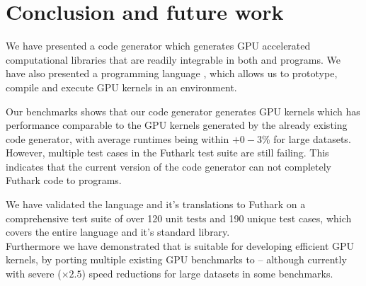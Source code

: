 \chapter{Conclusion and future work}
We have presented a code generator which generates GPU accelerated computational
libraries that are readily integrable in both \csharp{} and \fsharp{} programs.
We have also presented a programming language \fshark{}, which allows us to
prototype, compile and execute GPU kernels in an \fsharp{} environment.

Our benchmarks shows that our \csharp{} code generator generates GPU kernels
which has performance comparable to the GPU kernels generated by the already
existing \clang{} code generator, with average runtimes being within $+0-3\%$ for
large datasets.
However, multiple test cases in the Futhark test suite are still failing. This
indicates that the current version of the \csharp{} code generator can not
completely Futhark code to \csharp{} programs.

We have validated the \fshark{} language and it's translations to Futhark on a
comprehensive test suite of over 120 unit tests and 190 unique test cases, which covers the entire \fsharp{} language and it's
standard library.\\
Furthermore we have demonstrated that \fshark{} is suitable for
developing efficient GPU kernels, by porting multiple existing GPU benchmarks to
\fshark{} \--- although currently with severe ($\times 2.5$) speed reductions
for large datasets in some benchmarks.

